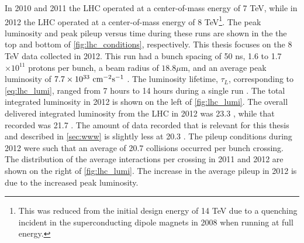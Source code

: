 In 2010 and 2011 the LHC operated at a center-of-mass energy of 7 TeV, while
in 2012 the LHC operated at a center-of-mass energy of 8 TeV\footnote{This
was reduced from the initial design energy of 14 TeV due to a quenching incident
in the superconducting dipole magnets in 2008 when running at full energy.}.
The peak luminosity and peak pileup versus time during these runs
are shown in the the top and bottom of \fig\ref{fig:lhc_conditions}, respectively.
This thesis focuses on the 8 TeV data collected in 2012.
This run had 
a bunch spacing of 50 ns, 1.6 to 1.7 $\times 10^{11}$ protons
per bunch, a beam radius of $18.8 \mu$m, and an average peak 
luminosity of $7.7 \times 10^{33}~\textrm{cm}^{-2}\textrm{s}^{-1}$ \cite{Lamont:1709796}.
The luminosity lifetime, $\tau_L$, corresponding to \eqn\eqref{eq:lhc_lumi},
ranged from 7 hours to 14 hours during a single run \cite{Hostettler:2013qya}.
The total integrated luminosity in 2012 is shown 
on the left of \fig\ref{fig:lhc_lumi}.
The overall delivered integrated luminosity from the LHC
in 2012 was 23.3 \ifb, while that recorded was 21.7 \ifb. The 
amount of data recorded that is relevant for this thesis
and described in \sec\ref{sec:www} is slightly less at 20.3 \ifb.
The pileup conditions during 2012 were such that an average
of 20.7 collisions occurred per bunch crossing. The distribution
of the average interactions per crossing in 2011 and 2012 are shown on
the right of \fig\ref{fig:lhc_lumi}. The increase in the average pileup 
in 2012 is due to the increased peak luminosity.




